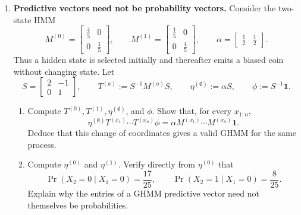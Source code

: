 \begin{exercise}
\begin{enumerate}
\begin{enumerate}
        \item Derive the recursive update and identify its normalising
          factor:
          \[
            \eta^{(x_{1:n}a)}
              =\frac{\eta^{(x_{1:n})}T^{(a)}}
                {\eta^{(x_{1:n})}T^{(a)}\phi},
            \qquad
            \Pr(X_{n+1}=a\mid X_{1:n}=x_{1:n})
              =\eta^{(x_{1:n})}T^{(a)}\phi.
          \]

        \item Conceptually contrast an HMM belief state with a GHMM
          predictive vector. Compare the meaning of their coordinates, their
          positivity and normalisation properties, and how they encode
          predictions of future observations.
      \end{enumerate}

    \item \textbf{Predictive vectors need not be probability vectors.}
      Consider the two-state HMM
      \[
        M^{(0)}=
          \begin{bmatrix}\tfrac45&0\\0&\tfrac15\end{bmatrix},
        \qquad
        M^{(1)}=
          \begin{bmatrix}\tfrac15&0\\0&\tfrac45\end{bmatrix},
        \qquad
        \alpha=\begin{bmatrix}\tfrac12&\tfrac12\end{bmatrix}.
      \]
      Thus a hidden state is selected initially and thereafter emits a biased
      coin without changing state. Let
      \[
        S=\begin{bmatrix}2&-1\\0&1\end{bmatrix},
        \qquad
        T^{(a)}:=S^{-1}M^{(a)}S,\qquad
        \eta^{(\emptyset)}:=\alpha S,\qquad
        \phi:=S^{-1}\mathbf 1.
      \]
      \begin{enumerate}
        \item Compute $T^{(0)},T^{(1)},\eta^{(\emptyset)}$, and $\phi$.
          Show that, for every $x_{1:n}$,
          \[
            \eta^{(\emptyset)}
              T^{(x_1)}\cdots T^{(x_n)}\phi
              =
            \alpha M^{(x_1)}\cdots M^{(x_n)}\mathbf 1.
          \]
          Deduce that this change of coordinates gives a valid GHMM for the
          same process.

        \item Compute $\eta^{(0)}$ and $\eta^{(1)}$. Verify directly from
          $\eta^{(0)}$ that
          \[
            \Pr(X_2=0\mid X_1=0)=\frac{17}{25},
            \qquad
            \Pr(X_2=1\mid X_1=0)=\frac8{25}.
          \]
          Explain why the entries of a GHMM predictive vector need not
          themselves be probabilities.
      \end{enumerate}


\end{enumerate}
\end{exercise}
